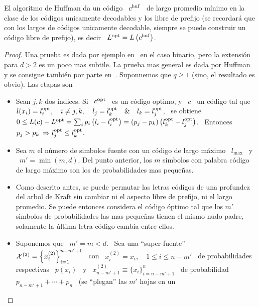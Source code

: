 \begin{teorema}
  El algoritmo de Huffman da un c\'odigo \ $c^{\mathrm{huf}}$ \ de largo promedio m\'inimo
  en la clase de los c\'odigos  unicamente decodables y los libre de prefijo (se
  recordar\'a que con  los largos de c\'odigos unicamente  decodable, siempre se
  puede construir  un c\'odigo libre de  prefijo), es decir \  $L^{\mathrm{opt}} = L\left(
    c^{\mathrm{huf}} \right)$.
\end{teorema}
%
\begin{proof}
  Una  prueba  es  dada  por  ejemplo en~\cite[Sec.~5.8]{CovTho06}  en  el  caso
  binario, pero la  extensi\'on para $d >  2$ es un poco mas  subtile. La prueba
  mas general es dada por Huffman~\cite{Huf52} y se consigue tambi\'en por parte
  en~\cite{Pig03}. Suponnemos que  $q \ge 1$ (sino, el  resultado es obvio). Las
  etapas son
  \begin{itemize}
  \item Sean $j, k$ dos indices. Si \  $c^{\mathrm{opt}}$ \ es un c\'odigo optimo, y \ $c$
    \ un c\'odigo tal  que \ $l(x_i) = l^{\mathrm{opt}}_i, \quad i \ne j  , k, \quad l_j =
    l^{\mathrm{opt}}_k \quad \& \quad l_k = l^{\mathrm{opt}}_j$, \ se obtiene \ $0 \le L(c) - L^{\mathrm{opt}}
    = \sum_i p_i \left(  l_i - l^{\mathrm{opt}}_i \right) = (p_j -  p_k) \left( l^{\mathrm{opt}}_k -
      l^{\mathrm{opt}}_j  \right)$.  \  Entonces $p_j  > p_k  \: \Rightarrow  l^{\mathrm{opt}}_j \le
    l^{\mathrm{opt}}_k$.
  \item Sea $m$ el n\'umero de simbolos fuente con un c\'odigo de largo m\'aximo
    \ $l_{\max}$ \  y \ $m' = \min(m,d)$.  Del punto  anterior, los $m$ simbolos
    con  palabra  c\'odigo de  largo  m\'aximo  son  los de  probabilidades  mas
    peque\~nas.
  \item  Como descrito  antes, se  puede permutar  las letras  c\'odigos  de una
    profundez del arbol de Kraft sin  cambiar ni el aspecto libre de prefijo, ni
    el largo promedio. Se puede  entonces considera el c\'odigo \'optimo tal que
    los $m'$ simbolos de probabilidades  las mas peque\~nas tienen el mismo nudo
    padre, \ie solamente la \'ultima letra c\'odigo cambia entre ellos.
  \item Suponemos que \ $m' = m  < d$.  \ Sea una ``super-fuente'' \ $\mathcal{X}^{(2)} =
    \left\{ x^{(2)}_i \right\}_{i=1}^{n-m'+1}$ \ con \ $x^{(2)}_i = x_i, \quad 1
    \le  i  \le  n-m'$  \  de  probabilidades  respectivas  \  $p(x_i)$  \  y  \
    $x^{(2)}_{n-m'+1}  \equiv  \{  x_i  \}_{i=n-m'+1}^n$  \  de  probabilidad  \
    $p_{n-m'+1}  +  \cdots  +  p_n$  \  (se ``plegan''  las  $m'$  hojas  en  un

\end{itemize}
\end{proof}
